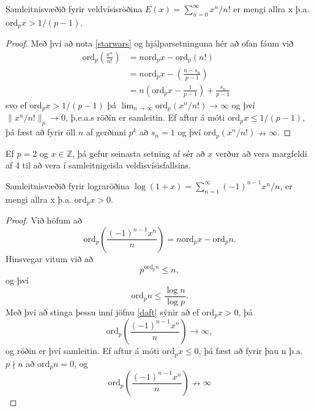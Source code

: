 \begin{setn}
Samleitnisvæðið fyrir veldvísisröðina $E(x) = \sum_{n=0}^{\infty} x^n/n!$ er mengi allra x þ.a.
$\mbox{ord}_px>1/(p-1)$.
\end{setn}
\begin{proof}
Með því að nota \ref{starwars} og hjálparsetninguna hér að ofan fáum við
\begin{align*}
\mbox{ord}_p \left( \frac{x^n}{n!} \right) & =  n \mbox{ord}_p x - \mbox{ord}_p(n!) & \\
 & =  n \mbox{ord}_p x - \left( \frac{n - s_n}{p-1} \right) &\\ 
 & =  n \left( \mbox{ord}_p x - \frac{1}{p-1} \right) + \frac{s_n}{p-1}&
\end{align*}
svo ef $\mbox{ord}_p x > 1/(p-1)$ þá $\lim_{n\rightarrow \infty } \mbox{ord}_p (x^n/n!) \rightarrow \infty$ 
og því $\|x^n/n!\|_p \rightarrow 0$, þ.e.a.s röðin er samleitin.
Ef aftur á móti $\mbox{ord}_px \leq 1/(p-1)$, þá fæst að fyrir öll $n$ af gerðinni $p^k$ að $s_n = 1$ og því $\mbox{ord}_p(x^n/n!) \nrightarrow \infty$.
\end{proof}
\begin{daemi}
Ef $p=2$ og $x \in \mathbb{Z}$, þá gefur seinasta setning af sér að $x$ verður að vera margfeldi af 4 til að vera í samleitnigeisla veldisvísisfallsins. 
\end{daemi}

\begin{setn}
Samleitnisvæðið fyrir lograröðina $\log(1+x) = \sum_{n=1}^{\infty} (-1)^{n-1}x^n/n$, er mengi allra x þ.a. $\mbox{ord}_px>0$.
\end{setn}
\begin{proof}
Við höfum að 
\begin{equation} \label{daft}
\mbox{ord}_p \left( \frac{(-1)^{n-1}x^n}{n} \right) = n \mbox{ord}_px - \mbox{ord}_p n.
\end{equation}
Hinsvegar vitum við að 
\begin{equation*}
p^{\mbox{ord}_p n} \leq n,
\end{equation*}
og því 
\begin{equation*}
\mbox{ord}_p n \leq \frac{\log n}{\log p}.
\end{equation*}
Með því að stinga þessu inní jöfnu \ref{daft} sýnir að ef $\mbox{ord}_p x> 0$, þá
\begin{equation*}
\mbox{ord}_p \left( \frac{(-1)^{n-1}x^n}{n} \right) \rightarrow \infty,
\end{equation*}
og röðin er því samleitin. Ef aftur á móti $\mbox{ord}_p x \leq 0$, þá fæst að fyrir þau n þ.a. $p \nmid n $ að $\mbox{ord}_pn=0$, og
\begin{equation*}
\mbox{ord}_p \left( \frac{(-1)^{n-1}x^n}{n} \right) \nrightarrow \infty
\end{equation*}
\end{proof}

